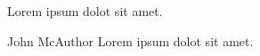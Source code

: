 \begin{pull}
Lorem ipsum dolot sit amet.
\end{pull}

\begin{pull}{John McAuthor}
Lorem ipsum dolot sit amet.
\end{pull}


